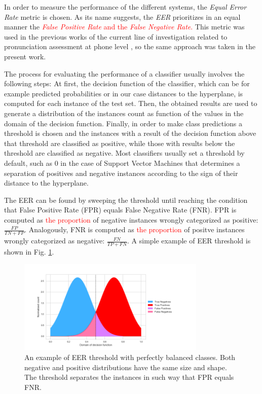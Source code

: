 In order to measure the performance of the different systems, the \textit{Equal Error Rate} metric
is chosen. As its name suggests, the \textit{EER} prioritizes in an equal manner the
\textcolor{red}{
  \textit{False Positive Rate} and the \textit{False Negative Rate}.
}
This metric was used
in the previous works of the current line of investigation related to pronunciation assessment
at phone level \cite{detection_phone_level_mispronunciation_learning, main}, so the same approach
was taken in the present work.

The process for evaluating the performance of a classifier usually involves the following steps:
At first, the decision function of the classifier, which can be for example predicted probabilities
or in our case distances to the hyperplane, is computed for each instance of the test set.
Then, the obtained results are used to generate
a distribution of the instances count as function of the values
in the domain of the decision function. Finally,
in order to make class predictions a threshold is chosen and the instances with a result of the
decision function above that threshold are classified as positive, while
those with results below the threshold are classified as negative. Most classifiers
usually set a threshold by default, such as 0 in the case of Support Vector Machines that
determines a separation of
positives and negative instances according to the sign of their distance to the hyperplane.

The EER can be found by sweeping the threshold until reaching the condition that
False Positive Rate (FPR) equals False Negative Rate (FNR). FPR is computed as
\textcolor{red}{the proportion} of negative instances wrongly
categorized as positive: $\frac{FP}{TN+FP}$.
Analogously, FNR is computed as \textcolor{red}{the proportion} of positve
instances wrongly categorized as negative:
$\frac{FN}{TP+FN}$. A simple example of EER threshold is
shown in Fig. \ref{fig:eer}.

\begin{figure}[H]
  \centering
  \includegraphics[width=0.8\textwidth]{files/figures/method/eer}
  \caption{An example of EER threshold with perfectly balanced classes. Both negative and positive distributions have the same size and shape.
  The threshold separates the instances in such way that FPR equals FNR.}
  \label{fig:eer}
\end{figure}

